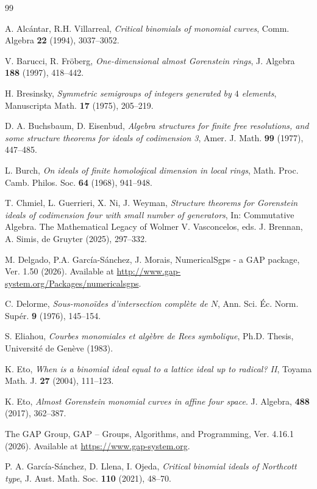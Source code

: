 \documentclass[11pt,twoside]{amsart}
\theoremstyle{definition}
\numberwithin{equation}{section}
\begin{document}
\begin{thebibliography}{99}

 A. Alc\'antar, R.H. Villarreal, \textit{Critical binomials of monomial curves}, Comm. Algebra {\bf 22} (1994), 3037--3052.

 V. Barucci, R. Fr\"oberg, \textit{One-dimensional almost Gorenstein rings}, J. Algebra \textbf{188} (1997), 418--442.

 H. Bresinsky, \textit{Symmetric semigroups of integers generated by $4$ elements}, Manuscripta Math. \textbf{17} (1975), 205--219.

D. A. Buchsbaum, D. Eisenbud,
\textit{Algebra structures for finite free resolutions, and some structure theorems for ideals of codimension 3},
Amer. J. Math. {\bf 99}  (1977), 447--485.

L. Burch, 
\textit{On ideals of finite homoloǵical dimension in local rings},
Math. Proc. Camb. Philos. Soc. {\bf 64}
(1968), 941--948.

 T. Chmiel, L. Guerrieri, X. Ni, J. Weyman, \textit{Structure theorems for Gorenstein ideals of codimension four with small number of generators}, In: Commutative Algebra. The Mathematical Legacy of Wolmer V. Vasconcelos, eds. J. Brennan, A. Simis, de Gruyter (2025), 297--332.

 M. Delgado, P.A. Garc\'ia-S\'anchez, J. Morais, NumericalSgps -
a GAP package, Ver. 1.50 (2026). Available at \url{http://www.gap-system.org/Packages/numericalsgps}.

 C. Delorme, \textit{Sous-monoïdes d’intersection complète de $ N$}, Ann. Sci. Éc. Norm. Supér. {\bf 9} (1976), 145--154.

 S. Eliahou, \textit{Courbes monomiales et algèbre de Rees symbolique}, Ph.D. Thesis, Universit\'e de Genève (1983).

K. Eto, \emph{When is a binomial ideal equal to a lattice ideal up to radical? II}, 
Toyama Math. J. {\bf 27} (2004), 111--123.

  K. Eto, \textit{Almost Gorenstein monomial curves in affine four space}. J. Algebra,
\textbf{488} (2017), 362--387.

 The GAP Group, GAP -- Groups, Algorithms, and Programming, Ver. 4.16.1 (2026). Available at \url{https://www.gap-system.org}.

  P. A. Garc\'ia-S\'anchez, D. Llena, I. Ojeda, \textit{Critical binomial ideals of Northcott type}, J. Aust. Math. Soc. {\bf 110} (2021), 48--70.


\end{thebibliography}
\end{document}
